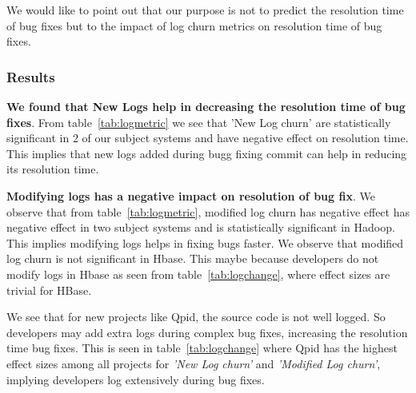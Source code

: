 \documentclass[conference]{IEEEtran}
\begin{document}
We would like to point out that our purpose is not to predict the resolution time of bug fixes but to the impact of log churn metrics on resolution time of bug fixes.

\subsubsection*{\textbf{Results}} \textbf{We found that New Logs help in decreasing the resolution time of bug fixes}. From table~\ref{tab:logmetric} we see that 'New Log churn' are statistically significant in 2 of our subject systems and have negative effect on resolution time. This implies that new logs added during bugg fixing commit can help in reducing its resolution time. 

\textbf{Modifying logs has a negative impact on resolution of bug fix}. We observe that from table~\ref{tab:logmetric}, modified log churn has negative effect has negative effect in two subject systems and is statistically significant in Hadoop. This implies  modifying logs helps in fixing bugs faster. We observe that modified log churn is not significant in Hbase. This maybe because developers do not modify logs in Hbase as seen from table~\ref{tab:logchange}, where effect sizes are trivial for HBase.

We see that for new projects like Qpid, the source code is not well logged. So developers may add extra logs during complex bug fixes, increasing the resolution time bug fixes. This is seen in table~\ref{tab:logchange} where Qpid has the highest effect sizes among all projects for \textsl{'New Log churn'} and \textsl{'Modified Log churn'}, implying developers log extensively during bug fixes.

%		
%	
%
%
\end{document}
